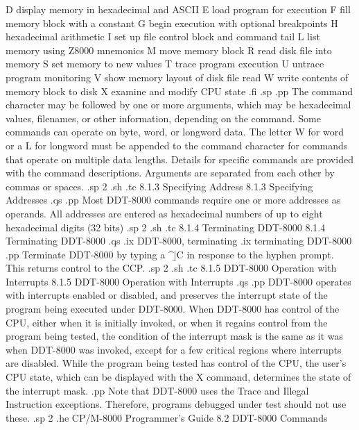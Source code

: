         D         display memory in hexadecimal and ASCII
        E         load program for execution
        F         fill memory block with a constant
        G         begin execution with optional breakpoints
        H         hexadecimal arithmetic
        I         set up file control block and command tail
        L         list memory using Z8000 mnemonics
        M         move memory block
        R         read disk file into memory
        S         set memory to new values
        T         trace program execution
        U         untrace program monitoring
        V         show memory layout of disk file read
        W         write contents of memory block to disk
        X         examine and modify CPU state
.fi
.sp
.pp
The command character may be followed by one or more arguments,
which may be hexadecimal values, filenames, or other information,
depending on the command.  Some commands can operate on byte,
word, or longword data.  The letter W for word or a L for
longword must be appended to the command character for commands
that operate on multiple data lengths.  Details for specific
commands are provided with the command descriptions.  Arguments
are separated from each other by commas or spaces. 
.sp 2
.sh
.tc         8.1.3  Specifying Address 
8.1.3  Specifying Addresses
.qs
.pp 
Most DDT-8000 commands require one or more addresses as operands.  All 
addresses are entered as hexadecimal numbers of up to eight hexadecimal 
digits (32 bits)
.sp 2
.sh
.tc         8.1.4  Terminating DDT-8000
8.1.4  Terminating DDT-8000
.qs
.ix DDT-8000, terminating
.ix terminating DDT-8000
.pp 
Terminate DDT-8000 by typing a ^\b|C in response to the hyphen prompt.
This returns control to the CCP.  
.sp 2
.sh
.tc         8.1.5  DDT-8000 Operation with Interrupts
8.1.5  DDT-8000 Operation with Interrupts
.qs
.pp 
DDT-8000 operates with interrupts enabled or disabled, and preserves the
interrupt state of the program being executed under DDT-8000.  When DDT-8000
has control of the CPU, either when it is initially invoked, or when it
regains control from the program being tested, the condition of the
interrupt mask is the same as it was when DDT-8000 was invoked, except for a
few critical regions where interrupts are disabled.  While the program
being tested has control of the CPU, the user's CPU state, which can be
displayed with the X command, determines the state of the interrupt 
mask.
.pp
Note that DDT-8000 uses the Trace and Illegal Instruction 
exceptions.  Therefore, programs debugged under test should not 
use these.
.sp 2
.he CP/M-8000 Programmer's Guide                 8.2  DDT-8000 Commands
